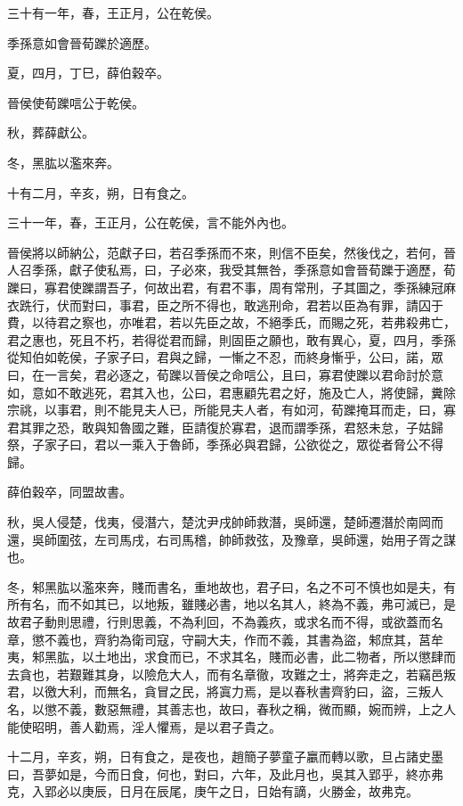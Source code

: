\begin{pinyinscope}
三十有一年，春，王正月，公在乾侯。

季孫意如會晉荀躒於適歷。

夏，四月，丁巳，薛伯穀卒。

晉侯使荀躒唁公于乾侯。

秋，葬薛獻公。

冬，黑肱以濫來奔。

十有二月，辛亥，朔，日有食之。

三十一年，春，王正月，公在乾侯，言不能外內也。

晉侯將以師納公，范獻子曰，若召季孫而不來，則信不臣矣，然後伐之，若何，晉人召季孫，獻子使私焉，曰，子必來，我受其無咎，季孫意如會晉荀躒于適歷，荀躒曰，寡君使躒謂吾子，何故出君，有君不事，周有常刑，子其圖之，季孫練冠麻衣跣行，伏而對曰，事君，臣之所不得也，敢逃刑命，君若以臣為有罪，請囚于費，以待君之察也，亦唯君，若以先臣之故，不絕季氏，而賜之死，若弗殺弗亡，君之惠也，死且不朽，若得從君而歸，則固臣之願也，敢有異心，夏，四月，季孫從知伯如乾侯，子家子曰，君與之歸，一慚之不忍，而終身慚乎，公曰，諾，眾曰，在一言矣，君必逐之，荀躒以晉侯之命唁公，且曰，寡君使躒以君命討於意如，意如不敢逃死，君其入也，公曰，君惠顧先君之好，施及亡人，將使歸，糞除宗祧，以事君，則不能見夫人已，所能見夫人者，有如河，荀躒掩耳而走，曰，寡君其罪之恐，敢與知魯國之難，臣請復於寡君，退而謂季孫，君怒未怠，子姑歸祭，子家子曰，君以一乘入于魯師，季孫必與君歸，公欲從之，眾從者脅公不得歸。

薛伯穀卒，同盟故書。

秋，吳人侵楚，伐夷，侵潛六，楚沈尹戌帥師救潛，吳師還，楚師遷潛於南岡而還，吳師圍弦，左司馬戌，右司馬稽，帥師救弦，及豫章，吳師還，始用子胥之謀也。

冬，邾黑肱以濫來奔，賤而書名，重地故也，君子曰，名之不可不慎也如是夫，有所有名，而不如其已，以地叛，雖賤必書，地以名其人，終為不義，弗可滅已，是故君子動則思禮，行則思義，不為利回，不為義疚，或求名而不得，或欲蓋而名章，懲不義也，齊豹為衛司寇，守嗣大夫，作而不義，其書為盜，邾庶其，莒牟夷，邾黑肱，以土地出，求食而已，不求其名，賤而必書，此二物者，所以懲肆而去貪也，若艱難其身，以險危大人，而有名章徹，攻難之士，將奔走之，若竊邑叛君，以徼大利，而無名，貪冒之民，將寘力焉，是以春秋書齊豹曰，盜，三叛人名，以懲不義，數惡無禮，其善志也，故曰，春秋之稱，微而顯，婉而辨，上之人能使昭明，善人勸焉，淫人懼焉，是以君子貴之。

十二月，辛亥，朔，日有食之，是夜也，趙簡子夢童子臝而轉以歌，旦占諸史墨曰，吾夢如是，今而日食，何也，對曰，六年，及此月也，吳其入郢乎，終亦弗克，入郢必以庚辰，日月在辰尾，庚午之日，日始有謫，火勝金，故弗克。


\end{pinyinscope}
